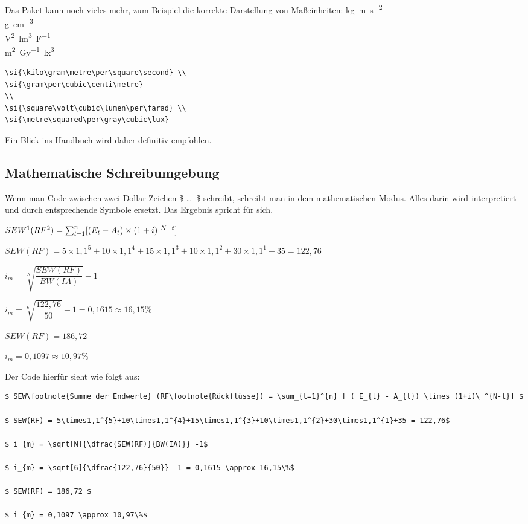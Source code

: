Das Paket kann noch vieles mehr, zum Beispiel die korrekte Darstellung von Maßeinheiten:
\si{\kilo\gram\metre\per\square\second} \\
\si{\gram\per\cubic\centi\metre}
\\
\si{\square\volt\cubic\lumen\per\farad} \\
\si{\metre\squared\per\gray\cubic\lux}

\begin{lstlisting}[float=htb,caption=Darstellung von Einheiten mit siunitx,label=lst:einheiten]
\si{\kilo\gram\metre\per\square\second} \\
\si{\gram\per\cubic\centi\metre}
\\
\si{\square\volt\cubic\lumen\per\farad} \\
\si{\metre\squared\per\gray\cubic\lux}
\end{lstlisting}

Ein Blick ins Handbuch wird daher definitiv empfohlen.
\subsection{Mathematische Schreibumgebung}%
\label{sec:math-umg}
Wenn man Code zwischen zwei Dollar Zeichen \$ \dots\ \$ schreibt, schreibt man in dem mathematischen Modus. Alles darin wird interpretiert und durch entsprechende Symbole ersetzt. Das Ergebnis spricht für sich.

$ SEW\footnote{Summe der Endwerte} (RF\footnote{Rückflüsse}) = \sum_{t=1}^{n} [ ( E_{t} - A_{t}) \times (1+i)\ ^{N-t}] $

$ SEW(RF) = 5\times1,1^{5}+10\times1,1^{4}+15\times1,1^{3}+10\times1,1^{2}+30\times1,1^{1}+35 = 122,76$

$ i_{m} = \sqrt[N]{\dfrac{SEW(RF)}{BW(IA)}} -1$

$ i_{m} = \sqrt[6]{\dfrac{122,76}{50}} -1 = 0,1615 \approx 16,15\%$

$ SEW(RF) = 186,72 $

$ i_{m} = 0,1097 \approx 10,97\%$

Der Code hierfür sieht wie folgt aus:
\begin{lstlisting}[float=htb,caption=Darstellungen von mathematischen Formeln,label=lst:inlinemath]
$ SEW\footnote{Summe der Endwerte} (RF\footnote{Rückflüsse}) = \sum_{t=1}^{n} [ ( E_{t} - A_{t}) \times (1+i)\ ^{N-t}] $

$ SEW(RF) = 5\times1,1^{5}+10\times1,1^{4}+15\times1,1^{3}+10\times1,1^{2}+30\times1,1^{1}+35 = 122,76$

$ i_{m} = \sqrt[N]{\dfrac{SEW(RF)}{BW(IA)}} -1$

$ i_{m} = \sqrt[6]{\dfrac{122,76}{50}} -1 = 0,1615 \approx 16,15\%$

$ SEW(RF) = 186,72 $

$ i_{m} = 0,1097 \approx 10,97\%$
\end{lstlisting}


